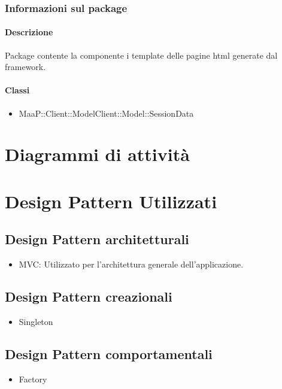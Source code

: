 \subsubsection{Informazioni sul package}
\paragraph{Descrizione}
Package contente la componente i template delle pagine html generate dal framework.

\paragraph{Classi}
\begin{itemize}
\item MaaP::Client::ModelClient::Model::SessionData
\end{itemize}


\newpage
\section{Diagrammi di attività}

\newpage
\section{Design Pattern Utilizzati}%
\subsection{Design Pattern architetturali} %
\begin{itemize}
\item MVC: Utilizzato per l'architettura generale dell'applicazione.
\end{itemize}
\subsection{Design Pattern creazionali} %
\begin{itemize}
\item Singleton
\end{itemize}
\subsection{Design Pattern comportamentali} %
\begin{itemize}
\item Factory
\end{itemize}
